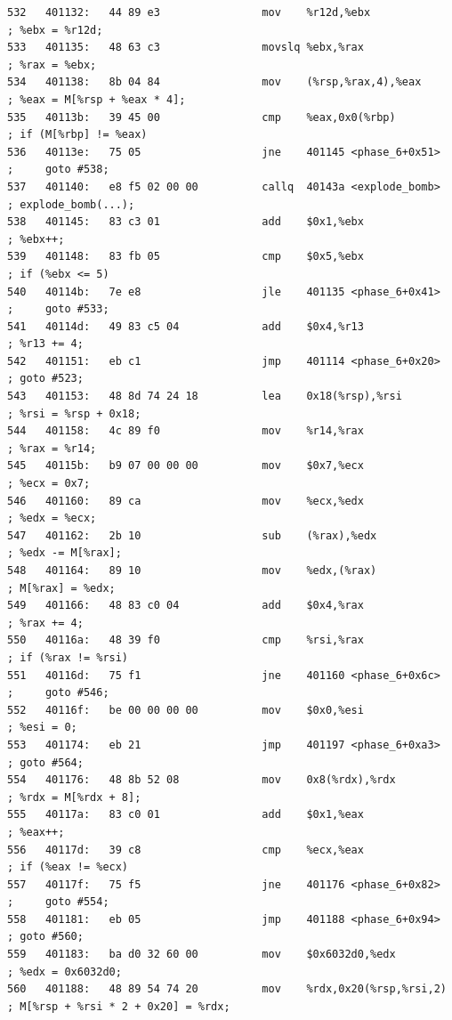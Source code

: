 \documentclass{article}
\begin{document}
\begin{lstlisting}[title = phase\_6对应的反汇编代码及注释, xleftmargin = 2em,xrightmargin = 2em, aboveskip = 1em, numbers = none, basicstyle=\footnotesize\ttfamily]
532   401132:   44 89 e3                mov    %r12d,%ebx                   ; %ebx = %r12d;
533   401135:   48 63 c3                movslq %ebx,%rax                    ; %rax = %ebx;
534   401138:   8b 04 84                mov    (%rsp,%rax,4),%eax           ; %eax = M[%rsp + %eax * 4];
535   40113b:   39 45 00                cmp    %eax,0x0(%rbp)               ; if (M[%rbp] != %eax)
536   40113e:   75 05                   jne    401145 <phase_6+0x51>        ;     goto #538;
537   401140:   e8 f5 02 00 00          callq  40143a <explode_bomb>        ; explode_bomb(...);
538   401145:   83 c3 01                add    $0x1,%ebx                    ; %ebx++;
539   401148:   83 fb 05                cmp    $0x5,%ebx                    ; if (%ebx <= 5)
540   40114b:   7e e8                   jle    401135 <phase_6+0x41>        ;     goto #533;
541   40114d:   49 83 c5 04             add    $0x4,%r13                    ; %r13 += 4;
542   401151:   eb c1                   jmp    401114 <phase_6+0x20>        ; goto #523;
543   401153:   48 8d 74 24 18          lea    0x18(%rsp),%rsi              ; %rsi = %rsp + 0x18;
544   401158:   4c 89 f0                mov    %r14,%rax                    ; %rax = %r14;
545   40115b:   b9 07 00 00 00          mov    $0x7,%ecx                    ; %ecx = 0x7;
546   401160:   89 ca                   mov    %ecx,%edx                    ; %edx = %ecx;
547   401162:   2b 10                   sub    (%rax),%edx                  ; %edx -= M[%rax];
548   401164:   89 10                   mov    %edx,(%rax)                  ; M[%rax] = %edx;
549   401166:   48 83 c0 04             add    $0x4,%rax                    ; %rax += 4;
550   40116a:   48 39 f0                cmp    %rsi,%rax                    ; if (%rax != %rsi)
551   40116d:   75 f1                   jne    401160 <phase_6+0x6c>        ;     goto #546;
552   40116f:   be 00 00 00 00          mov    $0x0,%esi                    ; %esi = 0;
553   401174:   eb 21                   jmp    401197 <phase_6+0xa3>        ; goto #564;
554   401176:   48 8b 52 08             mov    0x8(%rdx),%rdx               ; %rdx = M[%rdx + 8];
555   40117a:   83 c0 01                add    $0x1,%eax                    ; %eax++;
556   40117d:   39 c8                   cmp    %ecx,%eax                    ; if (%eax != %ecx)
557   40117f:   75 f5                   jne    401176 <phase_6+0x82>        ;     goto #554;
558   401181:   eb 05                   jmp    401188 <phase_6+0x94>        ; goto #560;
559   401183:   ba d0 32 60 00          mov    $0x6032d0,%edx               ; %edx = 0x6032d0;
560   401188:   48 89 54 74 20          mov    %rdx,0x20(%rsp,%rsi,2)       ; M[%rsp + %rsi * 2 + 0x20] = %rdx;

\end{lstlisting}
\end{document}
